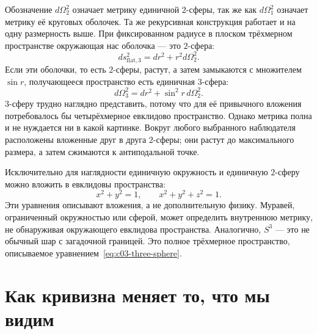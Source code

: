 Обозначение \(d\Omega_2^2\) означает метрику единичной \(2\)-сферы, так же как \(d\Omega_1^2\) означает метрику её круговых оболочек. Та же рекурсивная конструкция работает и на одну размерность выше. При фиксированном радиусе в плоском трёхмерном пространстве окружающая нас оболочка — это \(2\)-сфера:
\begin{equation}
ds_{\text{flat},3}^2 = dr^2 + r^2 d\Omega_2^2.
\label{eq:c03-flat-three-polar}
\end{equation}
Если эти оболочки, то есть \(2\)-сферы, растут, а затем замыкаются с множителем \(\sin r\), получающееся пространство есть единичная \(3\)-сфера:
\begin{equation}
d\Omega_3^2 = dr^2 + \sin^2 r\, d\Omega_2^2.
\label{eq:c03-three-sphere}
\end{equation}
\(3\)-сферу трудно наглядно представить, потому что для её привычного вложения потребовалось бы четырёхмерное евклидово пространство. Однако метрика полна и не нуждается ни в какой картинке. Вокруг любого выбранного наблюдателя расположены вложенные друг в друга \(2\)-сферы; они растут до максимального размера, а затем сжимаются к антиподальной точке.

\begin{classroomqa}
\end{classroomqa}

Исключительно для наглядности единичную окружность и единичную \(2\)-сферу можно вложить в евклидовы пространства:
\begin{equation}
x^2+y^2=1,
\qquad
x^2+y^2+z^2=1.
\end{equation}
Эти уравнения описывают вложения, а не дополнительную физику. Муравей, ограниченный окружностью или сферой, может определить внутреннюю метрику, не обнаруживая окружающего евклидова пространства. Аналогично, \(S^3\) — это не обычный шар с загадочной границей. Это полное трёхмерное пространство, описываемое уравнением~\eqref{eq:c03-three-sphere}.

\section{Как кривизна меняет то, что мы видим}

